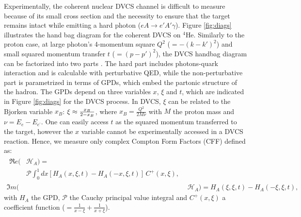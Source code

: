 \documentclass[nofootinbib,twocolumn,showpacs,prl,superscriptaddress,secnumarabic,amssymb,nobibnotes,aps,floatfix,preprint]{revtex4}
\begin{document}
Experimentally, the coherent nuclear DVCS channel is difficult to measure because of 
its small cross section and the necessity to ensure that the target remains 
intact while emitting a hard photon ($eA \rightarrow e' A' \gamma$). Figure 
\ref{fig:diags} illustrates the hand bag diagram for the coherent DVCS on 
$^4$He. Similarly to the proton case, at large photon's 4-momentum square 
$Q^2$ ($= -(k-k')^{2}$) and small squared momentum transfer $t$ 
($= (p-p')^{2}$), the DVCS handbag diagram can be factorized into two parts 
\cite{Freund_Collins,Ji_Osborne}. The hard part includes photons-quark 
interaction and is calculable with perturbative QED, while the non-perturbative 
part is parametrized in terms of GPDs, which embed the partonic structure of 
the hadron. The GPDs depend on three variables $x$, $\xi$ and $t$, which are 
indicated in Figure \ref{fig:diags} for the DVCS process. In DVCS, $\xi$ can 
be related to the Bjorken variable $x_{B}$: $\xi\approx {{x_B}\over{2-x_B}}$, 
where $x_B=\frac{Q^2}{2M\nu}$ with $M$ the proton mass and 
$\nu=E_e-E_{e^\prime}$. One can easily access $t$ as the squared momentum 
transferred to the target, however the $x$ variable cannot be experimentally 
accessed in a DVCS reaction. Hence, we measure only complex Compton Form 
Factors (CFF) \cite{Guidal:2013rya} defined as:
\begin{align}
\begin{split}
\Re e(&\mathcal{H}_{A}) = \\
    &\mathcal{P} 
\int_{0}^{1}dx[H_A(x,\xi,t)-H_A(-x,\xi,t)] \, C^{+}(x,\xi), 
\end{split} \\
\Im m(&\mathcal{H}_{A}) = H_A(\xi,\xi,t)-H_A(-\xi,\xi,t),
\end{align}
with $H_A$ the GPD, $\mathcal{P}$ 
the Cauchy principal value integral and $C^{+}(x,\xi)$ a coefficient function 
($=  \frac{1}{x-\xi} + \frac{1}{x+\xi}$).
\end{document}
